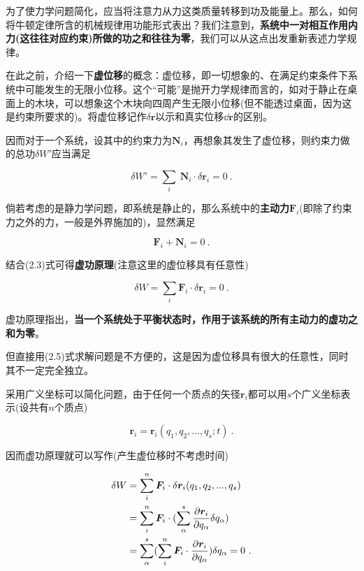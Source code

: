 \documentclass[a4paper,c5size,twoside,UTF8]{ctexart} %
\numberwithin{equation}{section}   %
\begin{document}
为了使力学问题简化，应当将注意力从力这类质量转移到功及能量上。那么，如何将牛顿定律所含的机械规律用功能形式表出？我们注意到，\textbf{系统中一对相互作用内力(这往往对应约束)所做的功之和往往为零}，我们可以从这点出发重新表述力学规律。

在此之前，介绍一下\textbf{虚位移}的概念：虚位移，即一切想象的、在满足约束条件下系统中可能发生的无限小位移。这个“可能”是抛开力学规律而言的，如对于静止在桌面上的木块，可以想象这个木块向四周产生无限小位移(但不能透过桌面，因为这是约束所要求的)。将虚位移记作$\delta \boldsymbol{r}$以示和真实位移$\dd \boldsymbol{r}$的区别。

因而对于一个系统，设其中的约束力为$\boldsymbol{N}_i$，再想象其发生了虚位移，则约束力做的总功$\delta W'$应当满足

\begin{equation}
    \delta W'= \sum_i~ \boldsymbol{N}_i \cdot \delta \boldsymbol{r}_i = 0~.
\end{equation}

倘若考虑的是静力学问题，即系统是静止的，那么系统中的\textbf{主动力}$\boldsymbol{F}_i$(即除了约束力之外的力，一般是外界施加的)，显然满足

\begin{equation}
      \boldsymbol{F}_i + \boldsymbol{N}_i=  0~.
\end{equation}

结合(2.3)式可得\textbf{虚功原理}(注意这里的虚位移具有任意性)

\begin{equation}
    \delta W = \sum_{i} \boldsymbol{F}_i \cdot \delta \boldsymbol{r}_i = 0~.
\end{equation}

虚功原理指出，\textbf{当一个系统处于平衡状态时，作用于该系统的所有主动力的虚功之和为零}。

但直接用(2.5)式求解问题是不方便的，这是因为虚位移具有很大的任意性，同时其不一定完全独立。

采用广义坐标可以简化问题，由于任何一个质点的矢径$\boldsymbol{r}_i$都可以用$s$个广义坐标表示(设共有$n$个质点)

\begin{equation}
    \boldsymbol{r}_i=\boldsymbol{r}_i(q_1,q_2,\dots,q_s;t)~.
\end{equation}

因而虚功原理就可以写作(产生虚位移时不考虑时间)

\begin{equation}
   \begin{aligned}
    \delta W & = \sum_i^n \boldsymbol{F}_i \cdot \delta \boldsymbol{r}_i(q_1,q_2,...,q_s) \\
             & = \sum_i^n \boldsymbol{F}_i \cdot  (\sum_\alpha^s \pdv{\boldsymbol{r}_i}{q_\alpha}\delta q_\alpha)\\
             & = \sum_\alpha^s (\sum_i^n \boldsymbol{F}_i \cdot \pdv{\boldsymbol{r}_i}{q_\alpha})\delta q_\alpha =0~.
   \end{aligned}
\end{equation}
\end{document}
